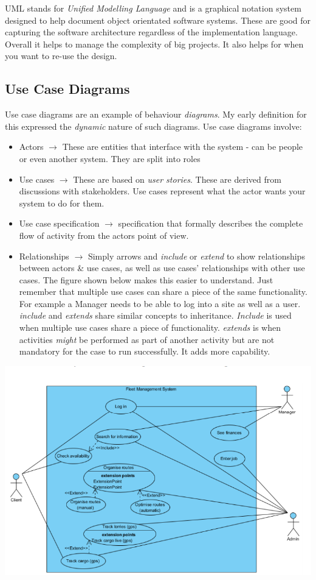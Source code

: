\documentclass{article}
\begin{document}
UML stands for \emph{Unified Modelling Language} and is a graphical notation system designed to help document object orientated software systems. These are good for capturing the software architecture regardless of the implementation language. Overall it helps to manage the complexity of big projects. It also helps for when you want to re-use the design.

\subsection{Use Case Diagrams}

Use case diagrams are an example of behaviour \emph{diagrams}. My early definition for this expressed the \emph{dynamic} nature of such diagrams. Use case diagrams involve:

\begin{itemize}
    \item Actors $\longrightarrow$ These are entities that interface with the system - can be people or even another system. They are split into roles
    \item Use cases $\longrightarrow$ These are based on \emph{user stories}. These are derived from discussions with stakeholders. Use cases represent what the actor wants your system to do for them.
    \item Use case specification $\longrightarrow$ specification that formally describes the complete flow of activity from the actors point of view.
    \item Relationships $\longrightarrow$ Simply arrows and  \emph{include} or  \emph{extend} to show relationships between actors \& use cases, as well as use cases' relationships with other use cases. The figure shown below makes this easier to understand. Just remember that multiple use cases can share a piece of the same functionality. For example a Manager needs to be able to log into a site as well as a user. \emph{include} and  \emph{extends} share similar concepts to inheritance. \emph{Include} is used when multiple use cases share a piece of functionality. \emph{extends} is when activities \emph{might} be performed as part of another activity but are not mandatory for the case to run successfully. It adds more capability.
\end{itemize}

\includegraphics[scale = 0.6]{useCase.png}
\end{document}
